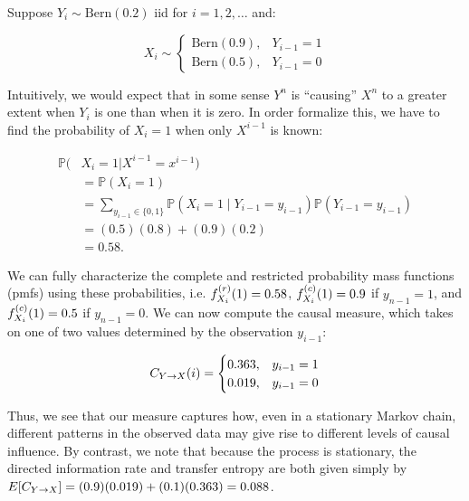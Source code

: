 \begin{example}
Suppose $Y_i \sim \text{Bern}(0.2)$ iid for $i=1,2,\dots$ and:

\begin{equation}
X_i \sim
\begin{cases}
      \text{Bern}(0.9), & Y_{i-1} = 1 \\
      \text{Bern}(0.5), & Y_{i-1} = 0
\end{cases}
\end{equation}

\noindent Intuitively, we would expect that in some sense $Y^n$ is ``causing'' $X^n$ to a greater extent when $Y_i$ is one than when it is zero. In order formalize this, we have to find the probability of $X_i=1$ when only $X^{i-1}$ is known:

\begin{equation*}
\begin{aligned}
\mathbb{P}(&X_i = 1 | X^{i-1}=x^{i-1}) \\
&= \mathbb{P}(X_i = 1) \\
&= \sum_{y_{i-1}\in \{0,1\}}
    \mathbb{P}(X_i =1 \mid Y_{i-1} = y_{i-1}) \mathbb{P}(Y_{i-1} = y_{i-1}) \\
&= (0.5)(0.8) + (0.9)(0.2) \\
&= 0.58.
\end{aligned}
\end{equation*}

\noindent We can fully characterize the complete and restricted probability mass functions (pmfs) using these probabilities, i.e. $f_{X_i}^{(r)}(1) = 0.58$, $f_{X_i}^{(c)}(1) = 0.9$ if $y_{n-1}=1$, and $f_{X_i}^{(c)}(1) = 0.5$ if $y_{n-1}=0$. We can now compute the causal measure, which takes on one of two values determined by the observation $y_{i-1}$:

\begin{equation}
C_{Y\rightarrow X}(i) =
\begin{cases}
      0.363, & y_{i-1} = 1 \\
      0.019, & y_{i-1} = 0
\end{cases}
\end{equation}

\noindent Thus, we see that our measure captures how, even in a stationary Markov chain, different patterns in the observed data may give rise to different levels of causal influence. By contrast, we note that because the process is stationary, the directed information rate and transfer entropy are both given simply by $E[C_{Y\rightarrow X}]=(0.9)(0.019)+(0.1)(0.363)=0.088$.
\end{example}

